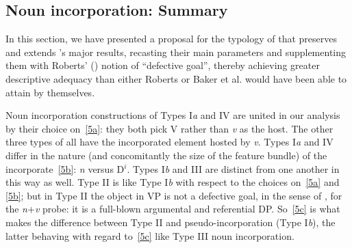 \documentclass[output=paper]{langsci/langscibook}
\newcommand{\posscite}[1]{\citeauthor{#1}'s \citeyearpar{#1}}
\begin{document}
\begin{refcontext}
\subsection{Noun incorporation: Summary}
In this section, we have presented a proposal for the typology of  that preserves
and extends \posscite{bakeretal05} major results, recasting their main parameters and supplementing
them with Roberts' (\citeyear{Roberts2010}) notion of \enquote{defective goal}, thereby achieving greater descriptive adequacy
than either Roberts or Baker et al. would have been able to attain by themselves.

Noun incorporation constructions of Types I\emph{a} and IV are united in our
analysis by their choice on~\eqref{5a}: they both pick V rather than \emph{v} as
the host. The other three types of  all have the incorporated
element hosted by \emph{v}. Types I\emph{a} and IV differ in the nature (and
concomitantly the size of the feature bundle) of the incorporate~\eqref{5b}:
\emph{n} versus D$^i$. Types I\emph{b} and III are distinct from one another in
this way as well. Type II is like Type I\emph{b} with respect to the choices
on~\eqref{5a} and \eqref{5b}; but in Type II the object in VP is not a defective
goal, in the sense of \citet{Roberts2010}, for the \emph{n}+\emph{v} probe: it is
a full-blown argumental and referential DP. So~\eqref{5c} is what makes the
difference between Type II  and pseudo-incorporation (Type
I\emph{b}), the latter behaving with regard to~\eqref{5c} like Type III noun
incorporation.


\end{refcontext}
\end{document}
